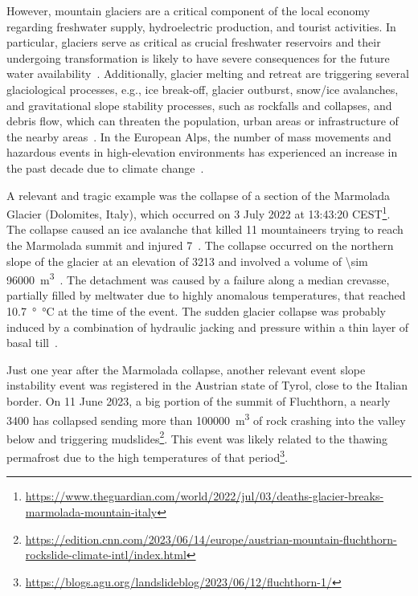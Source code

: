 However, mountain glaciers are a critical component of the local economy regarding freshwater supply, hydroelectric production, and tourist activities.
In particular, glaciers serve as critical as crucial freshwater reservoirs and their undergoing transformation is likely to have severe consequences for the future water availability~\citep{Barnett2005, hock2005}. 
Additionally, glacier melting and retreat are triggering several glaciological processes, e.g., ice break-off, glacier outburst, snow/ice avalanches, and gravitational slope stability processes, such as rockfalls and collapses, and debris flow, which can threaten the population, urban areas or infrastructure of the nearby areas~\citep{Kaab2004, Deline2015, Giordan2020}.
In the European Alps, the number of mass movements and hazardous events in high-elevation environments has experienced an increase in the past decade due to climate change~\citep{chiarle2023, Nigrelli2024}.


A relevant and tragic example was the collapse of a section of the Marmolada Glacier 
(Dolomites, Italy), which occurred on 3 July 2022 at 13:43:20 CEST\footnote{\url{https://www.theguardian.com/world/2022/jul/03/deaths-glacier-breaks-marmolada-mountain-italy}}. 
The collapse caused an ice avalanche that killed 11 mountaineers trying to reach the Marmolada summit and injured 7~\citep{Olivieri2023, Bondesan2023}.
The collapse occurred on the northern slope of the glacier at an elevation of \SI{3213}{\masl} and involved a volume of \SI{\sim 96000}{\cubic\meter}~\citep{Olivieri2023}.
The detachment was caused by a failure along a median crevasse, partially filled by meltwater due to highly anomalous temperatures, that reached \SI{10.7}{\degree\celsius} at the time of the event.
The sudden glacier collapse was probably induced by a combination of hydraulic jacking and pressure within a thin layer of basal till~\citep{Bondesan2023}.

Just one year after the Marmolada collapse, another relevant event slope instability event was registered in the Austrian state of Tyrol, close to the Italian border. 
On 11 June 2023, a big portion of the summit of Fluchthorn, a nearly \SI{3400}{\masl} has collapsed sending more than \SI{100000}{\cubic\meter} of rock crashing into the valley below and triggering mudslides\footnote{\mbox{\url{https://edition.cnn.com/2023/06/14/europe/austrian-mountain-fluchthorn-rockslide-climate-intl/index.html}}}.
This event was likely related to the thawing permafrost due to the high temperatures of that period\footnote{\url{https://blogs.agu.org/landslideblog/2023/06/12/fluchthorn-1/}}.

